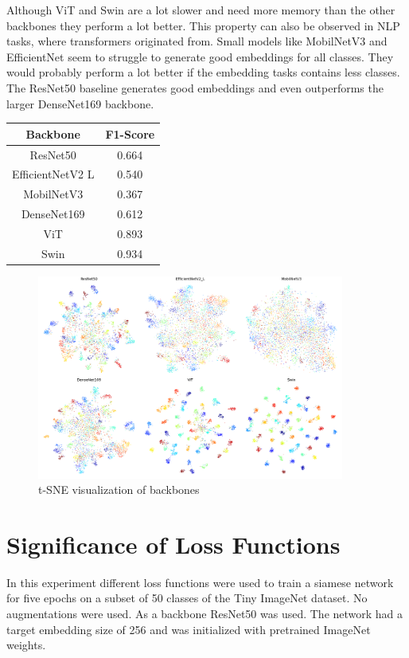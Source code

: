 \documentclass[12pt,a4paper]{report}
\newcommand{\splitlayout}[2]{
	\begin{minipage}{0.6\textwidth}
		#1
	\end{minipage}
	\hfill
	\begin{minipage}{0.35\textwidth}
		#2
	\end{minipage}	
}
\begin{document}
\splitlayout{
	Although ViT and Swin are a lot slower and need more memory than the other backbones they perform a lot better.
	This property can also be observed in NLP tasks, where transformers originated from.
	Small models like MobilNetV3 and EfficientNet seem to struggle to generate good embeddings for all classes.
	They would probably perform a lot better if the embedding tasks contains less classes.
	The ResNet50 baseline generates good embeddings and even outperforms the larger DenseNet169 backbone.
}{
	\begin{tabular}{ | c | c | }
		\hline
		Backbone & F1-Score \\ 
		\hline
		ResNet50 & 0.664 \\ 
		\hline
		EfficientNetV2 L & 0.540 \\ 
		\hline
		MobilNetV3 & 0.367 \\ 
		\hline
		DenseNet169 & 0.612 \\ 
		\hline
		ViT & 0.893 \\ 
		\hline
		Swin & 0.934 \\ 
		\hline
	\end{tabular}
}

\begin{figure}[h]
	\centering
	\includegraphics[width=0.9\textwidth]{../plots/backbones.png}
	\caption{t-SNE visualization of backbones}
\end{figure}

\newpage

\section{Significance of Loss Functions}

In this experiment different loss functions were used to train a siamese network for five epochs on a subset of 50 classes of the Tiny ImageNet dataset.
No augmentations were used.
As a backbone ResNet50 was used.
The network had a target embedding size of 256 and was initialized with pretrained ImageNet weights.
\end{document}
